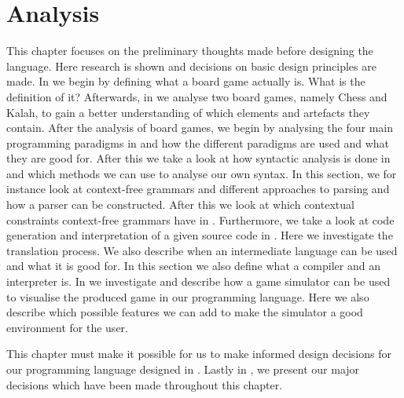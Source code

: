 \chapter{Analysis}
\label{chap:analysis}

This chapter focuses on the preliminary thoughts made before designing
the language. Here research is shown and decisions on basic design
principles are made. In  we begin by
defining what a board game actually is. What is the definition
of it? Afterwards, in  we analyse two
board games, namely Chess and Kalah, to gain a better understanding
of which elements and artefacts they contain. After the analysis
of board games, we begin by analysing the four main programming
paradigms in  and how the different paradigms
are used and what they are good for. After this we take a look at
how syntactic analysis is done in 
and which methods we can use to analyse our own syntax. In this
section, we for instance look at context-free grammars and different
approaches to parsing and how a parser can be constructed. After
this we look at which contextual constraints context-free grammars
have in . Furthermore, we take a
look at code generation and interpretation of a given source code in
. Here we investigate the
translation process. We also describe when an intermediate language can
be used and what it is good for. In this section we also define what a
compiler and an interpreter is. In  we investigate
and describe how a game simulator can be used to visualise the produced
game in our programming language. Here we also describe which possible
features we can add to make the simulator a good environment for the
user.

This chapter must make it possible for us to make informed
design decisions for our programming language designed in
. Lastly in ,
we present our major decisions which have been made throughout this
chapter.






%



